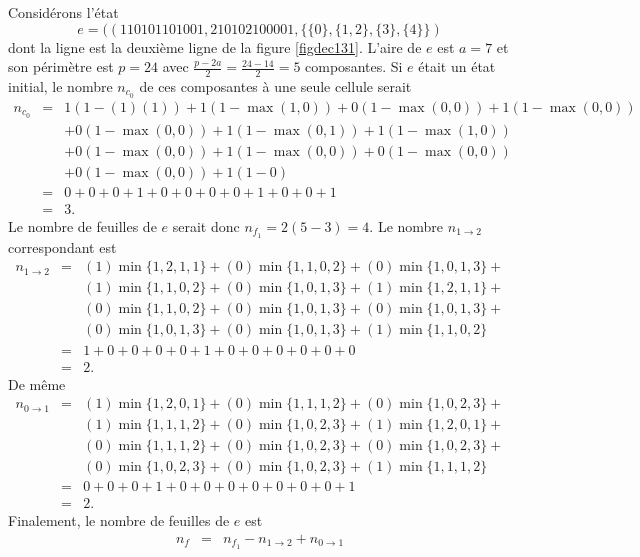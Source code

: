  \begin{Ex}\label{exdec131}
 Considérons l'état 
 $$e= ((110101101001,210102100001,\{\{0\},\{1,2\},\{3\},\{4\}\})$$
 dont la ligne est la deuxième ligne de la figure \ref{figdec131}.
 L'aire   de $e$ est  $a=7$ et son périmètre est $p =24$ avec $\frac{p-2a}{2}= \frac{24-14}{2}=5$ composantes. Si $e$ était un état initial, le nombre $n_{c_{0}}$ de ces composantes à une seule cellule serait
 \begin{eqnarray*}
n_{c_{0}} & = & 1(1-(1)(1)) + 1(1-\max(1,0))+ 0(1-\max(0,0))+ 1(1-\max(0,0))\\
& & + 0(1-\max(0,0))+ 1(1-\max(0,1))+ 1(1-\max(1,0))\\
& &+ 0(1-\max(0,0))+ 1(1-\max(0,0))+ 0(1-\max(0,0))\\
& &+ 0(1-\max(0,0))+ 1(1-0)\\
& = & 0+0+0+1+0+0+0+0+1+0+0+1\\
& = & 3.
 \end{eqnarray*}
 Le nombre de feuilles de $e$ serait donc $n_{f_{1}}= 2(5-3)=4$. Le nombre  $n_{1\rightarrow 2}$ correspondant est 
 \begin{eqnarray*}
 n_{1\rightarrow 2} & = & (1)\min\{1,2,1,1\}+(0)\min\{1,1,0,2\}+(0)\min\{1,0,1,3\}+\\
 & & (1)\min\{1,1,0,2\}+(0)\min\{1,0,1,3\}+(1)\min\{1,2,1,1\}+\\
 & & (0)\min\{1,1,0,2\}+(0)\min\{1,0,1,3\}+(0)\min\{1,0,1,3\}+\\
 & & (0)\min\{1,0,1,3\}+(0)\min\{1,0,1,3\}+(1)\min\{1,1,0,2\}\\
 & = & 1+0+0+0+0+1+0+0+0+0+0+0\\
 & = & 2.
 \end{eqnarray*}
 De même
 \begin{eqnarray*}
 n_{0\rightarrow 1} & = & (1)\min\{1,2,0,1\}+(0)\min\{1,1,1,2\}+(0)\min\{1,0,2,3\}+\\
 & & (1)\min\{1,1,1,2\}+(0)\min\{1,0,2,3\}+(1)\min\{1,2,0,1\}+\\
 & & (0)\min\{1,1,1,2\}+(0)\min\{1,0,2,3\}+(0)\min\{1,0,2,3\}+\\
 & & (0)\min\{1,0,2,3\}+(0)\min\{1,0,2,3\}+(1)\min\{1,1,1,2\}\\
 & = &  0+0+0+1+0+0+0+0+0+0+0+1\\
 & = & 2.
 \end{eqnarray*}
Finalement, le nombre de feuilles de $e$ est
 \begin{eqnarray*}
 n_{f} & = & n_{f_{1}}- n_{1\rightarrow 2}+ n_{0\rightarrow 1}\\

\end{eqnarray*}
\end{Ex}
